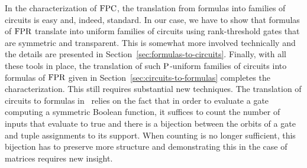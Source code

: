 \documentclass[../paper.tex]{subfiles}
\begin{document}
In the characterization of $\text{\upshape FPC}$, the translation from formulas into
families of circuits is easy and, indeed, standard.  In our case, we
have to show that formulas of $\text{\upshape FPR}$ translate into uniform families of
circuits using rank-threshold gates that are symmetric and
transparent.  This is somewhat more involved technically and the
details are presented in Section~\ref{sec:formulas-to-circuits}.
Finally, with all these tools in place, the translation of such
$\mathrm{P}$-uniform families of circuits into formulas of $\text{\upshape FPR}$ given in Section~\ref{sec:circuits-to-formulas} completes
the characterization.  This still requires substantial new
techniques.  The translation of circuits to formulas
in~\cite{AndersonD17} relies on the fact that in order to evaluate a
gate computing a symmetric Boolean function, it suffices to count the number
of inputs that evaluate to true and there is a bijection between the
orbits of a gate and tuple assignments to its support.  When counting
is no longer sufficient, this bijection has to preserve more structure
and demonstrating this in the case of matrices requires new insight.
\end{document}
